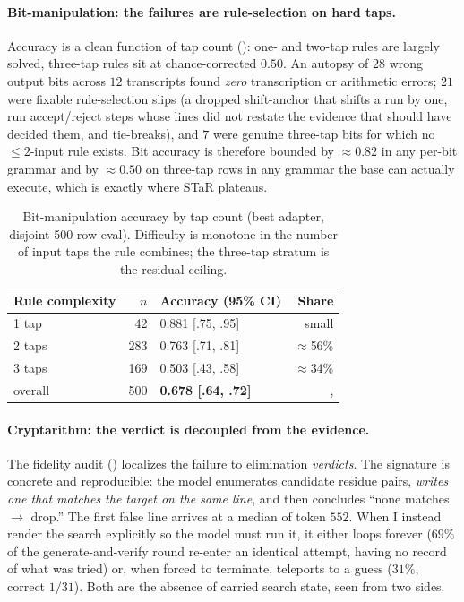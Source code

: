 \documentclass[11pt]{article}
\begin{document}
\paragraph{Bit-manipulation: the failures are rule-selection on hard taps.} Accuracy is a
clean function of tap count (): one- and two-tap rules are largely solved,
three-tap rules sit at chance-corrected $0.50$. An autopsy of $28$ wrong output bits across
$12$ transcripts found \emph{zero} transcription or arithmetic errors; $21$ were fixable
rule-selection slips (a dropped shift-anchor that shifts a run by one, run accept/reject
steps whose lines did not restate the evidence that should have decided them, and
tie-breaks), and $7$ were genuine three-tap bits for which no $\leq\!2$-input rule exists.
Bit accuracy is therefore bounded by $\approx\!0.82$ in any per-bit grammar and by $\approx\!0.50$
on three-tap rows in any grammar the base can actually execute, which is exactly where STaR
plateaus.

\begin{table}[htbp]
\centering
\caption{Bit-manipulation accuracy by tap count (best adapter, disjoint 500-row eval).
Difficulty is monotone in the number of input taps the rule combines; the three-tap stratum
is the residual ceiling.}
\label{tab:bittaps}
\small
\begin{tabular}{l r l r}
\toprule
Rule complexity & $n$ & Accuracy (95\% CI) & Share \\
\midrule
1 tap  & 42  & 0.881 [.75, .95] & small \\
2 taps & 283 & 0.763 [.71, .81] & $\approx$56\% \\
3 taps & 169 & 0.503 [.43, .58] & $\approx$34\% \\
\midrule
overall & 500 & \textbf{0.678 [.64, .72]} &, \\
\bottomrule
\end{tabular}
\end{table}

\paragraph{Cryptarithm: the verdict is decoupled from the evidence.} The fidelity audit
() localizes the failure to elimination \emph{verdicts}. The signature is
concrete and reproducible: the model enumerates candidate residue pairs, \emph{writes one
that matches the target on the same line}, and then concludes ``none matches $\to$ drop.''
The first false line arrives at a median of token $552$. When I instead render the search
explicitly so the model must run it, it either loops forever ($69\%$ of the
generate-and-verify round re-enter an identical attempt, having no record of what was tried)
or, when forced to terminate, teleports to a guess ($31\%$, correct $1/31$). Both are the
absence of carried search state, seen from two sides.
\end{document}
